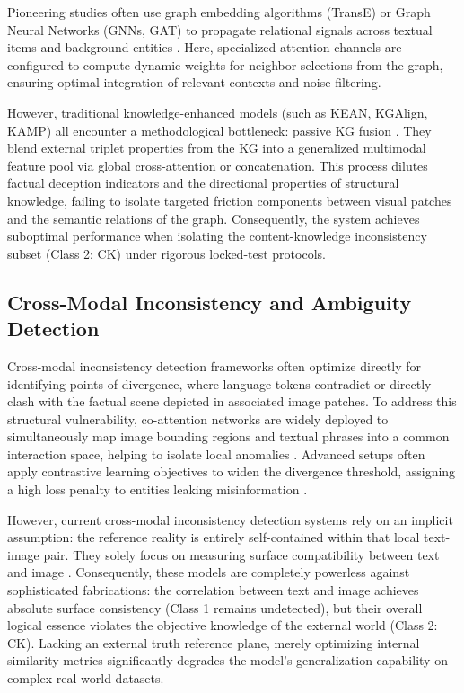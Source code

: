 Pioneering studies often use graph embedding algorithms (TransE) or Graph Neural Networks (GNNs, GAT) to propagate relational signals across textual items and background entities \cite{ref19, ref20, ref21}. Here, specialized attention channels are configured to compute dynamic weights for neighbor selections from the graph, ensuring optimal integration of relevant contexts and noise filtering.

However, traditional knowledge-enhanced models (such as KEAN, KGAlign, KAMP) all encounter a methodological bottleneck: passive KG fusion \cite{ref5}. They blend external triplet properties from the KG into a generalized multimodal feature pool via global cross-attention or concatenation. This process dilutes factual deception indicators and the directional properties of structural knowledge, failing to isolate targeted friction components between visual patches and the semantic relations of the graph. Consequently, the system achieves suboptimal performance when isolating the content-knowledge inconsistency subset (Class 2: CK) under rigorous locked-test protocols.

\subsection{Cross-Modal Inconsistency and Ambiguity Detection}
Cross-modal inconsistency detection frameworks often optimize directly for identifying points of divergence, where language tokens contradict or directly clash with the factual scene depicted in associated image patches. To address this structural vulnerability, co-attention networks are widely deployed to simultaneously map image bounding regions and textual phrases into a common interaction space, helping to isolate local anomalies \cite{ref14}. Advanced setups often apply contrastive learning objectives to widen the divergence threshold, assigning a high loss penalty to entities leaking misinformation \cite{ref22, ref23}.

However, current cross-modal inconsistency detection systems rely on an implicit assumption: the reference reality is entirely self-contained within that local text-image pair. They solely focus on measuring surface compatibility between text and image \cite{ref24, ref25, ref26}. Consequently, these models are completely powerless against sophisticated fabrications: the correlation between text and image achieves absolute surface consistency (Class 1 remains undetected), but their overall logical essence violates the objective knowledge of the external world (Class 2: CK). Lacking an external truth reference plane, merely optimizing internal similarity metrics significantly degrades the model's generalization capability on complex real-world datasets.

